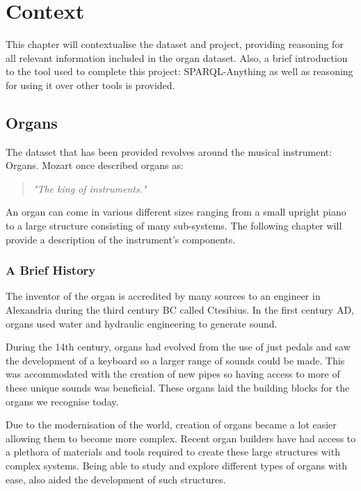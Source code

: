 \chapter{Context}
This chapter will contextualise the dataset and project, providing reasoning for all relevant information included in the organ dataset. Also, a brief introduction to the tool used to complete this project: SPARQL-Anything as well as reasoning for using it over other tools is provided. 

\section{Organs}
\hspace{0.5cm} The dataset that has been provided revolves around the musical instrument: Organs. Mozart once described organs as:

\begin{quote}
    \textit{"The king of instruments."}
\end{quote}

An organ can come in various different sizes ranging from a small upright piano to a large structure consisting of many sub-systems. The following chapter will provide a description of the instrument's components.

\subsection{A Brief History}
\hspace{0.5cm} 
The inventor of the organ is accredited by many sources to an engineer in Alexandria during the third century BC called Ctesibius. In the first century AD, organs used water and hydraulic engineering to generate sound. \cite{organhistory}

During the 14th century, organs had evolved from the use of just pedals and saw the development of a keyboard so a larger range of sounds could be made. This was accommodated with the creation of new pipes so having access to more of these unique sounds was beneficial. These organs laid the building blocks for the organs we recognise today. \cite{organmedivalhistory}

Due to the modernisation of the world, creation of organs became a lot easier allowing them to become more complex. Recent organ builders have had access to a plethora of materials and tools required to create these large structures with complex systems. Being able to study and explore different types of organs with ease, also aided the development of such structures.  \cite{organhistory1}

